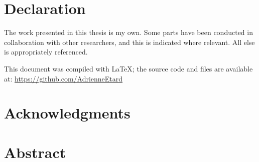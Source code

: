 \documentclass[11pt]{report}
\begin{document}



\chapter*{Declaration}
The work presented in this thesis is my own. Some parts have been conducted in collaboration
with other researchers, and this is indicated where relevant. All else is appropriately referenced.


\vspace{3cm}
This document was compiled with {\LaTeX}; the source code and files are available at: \url{https://github.com/AdrienneEtard}

\chapter*{Acknowledgments}

\chapter*{Abstract} %

\end{document}
